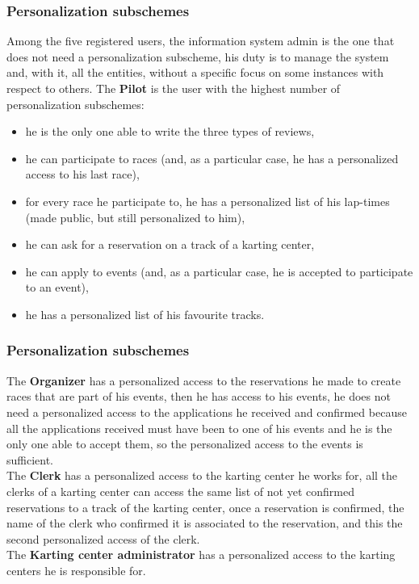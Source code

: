 \documentclass{beamer}
\begin{document}
\begin{frame}
    \frametitle{Personalization subschemes}
    \scriptsize
    Among the five registered users, the information system admin is the one that does not need a 
    personalization subscheme, his duty is to manage the system and, with it, all the entities, without
    a specific focus on some instances with respect to others.
    The \textbf{Pilot} is the user with the highest number of personalization subschemes: 
    \begin{itemize}
        \item he is the only one able to write the three types of reviews,
        \item he can participate to races (and, as a particular case,
        he has a personalized access to his last race),
        \item for every race he participate to, he has a personalized list of his lap-times (made public, but still
        personalized to him),
        \item he can ask for a reservation on a track of a karting center,
        \item he can apply to events (and, as a particular case, he is accepted to participate
        to an event),
        \item he has a personalized list of his favourite tracks.
    \end{itemize}
\end{frame}

\begin{frame}
    \frametitle{Personalization subschemes}
    \scriptsize
    The \textbf{Organizer} has a personalized access to the reservations he made to create races that are part of his events,
    then he has access to his events, he does not need a personalized access to the applications he received and confirmed
    because all the applications received must have been to one of his events and he is the only one able to accept them,
    so the personalized access to the events is sufficient.\\
    The \textbf{Clerk} has a personalized access to the karting center he works for, all the clerks of a karting center can 
    access the same list of not yet confirmed reservations to a track of the karting center, once a reservation is confirmed, the name of the clerk who confirmed it
    is associated to the reservation, and this the second personalized access of the clerk.\\
    The \textbf{Karting center administrator} has a personalized access to the karting centers he is responsible for.
\end{frame}
\end{document}
